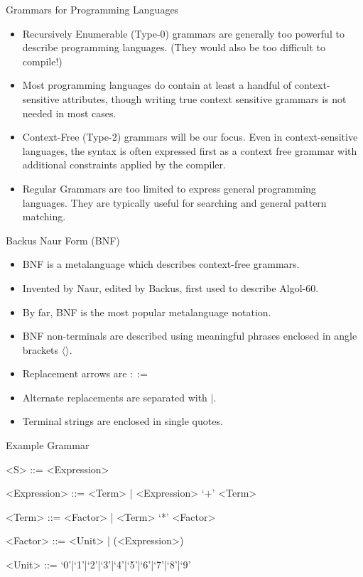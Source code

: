 \documentclass{beamer}
\begin{document}
\begin{frame}{Grammars for Programming Languages}
    \begin{itemize}[<+->]
        \item Recursively Enumerable (Type-0) grammars are generally
            too powerful to describe programming languages.  (They
            would also be too difficult to compile!)
        \item Most programming languages do contain at least a handful
            of context-sensitive attributes, though writing true
            context sensitive grammars is not needed in most cases.
        \item Context-Free (Type-2) grammars will be our focus.  Even
            in context-sensitive languages, the syntax is often
            expressed first as a context free grammar with additional
            constraints applied by the compiler.
        \item Regular Grammars are too limited to express general
            programming languages. They are typically useful for
            searching and general pattern matching.
    \end{itemize}
\end{frame}

\begin{frame}{Backus Naur Form (BNF)}
    \begin{itemize}[<+->]
        \item BNF is a metalanguage which describes context-free
            grammars.
        \item Invented by Naur, edited by Backus, first used to
            describe Algol-60.
        \item By far, BNF is the most popular metalanguage notation.
        \item BNF non-terminals are described using meaningful
            phrases enclosed in angle brackets $\langle \rangle$.
        \item Replacement arrows are $::=$ 
        \item Alternate replacements are separated with $|$.
        \item Terminal strings are enclosed in single quotes.
    \end{itemize}
\end{frame}

\begin{frame}{Example Grammar}
    \begin{grammar}
        <S> ::= <Expression>

        <Expression> ::= <Term> | <Expression> `+' <Term>

        <Term> ::= <Factor> | <Term> `*' <Factor>

        <Factor> ::= <Unit> | (<Expression>)

        <Unit> ::= `0'|`1'|`2'|`3'|`4'|`5'|`6'|`7'|`8'|`9'
    \end{grammar}
\end{frame}
\end{document}

